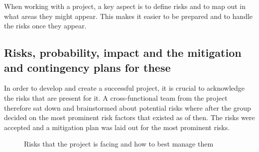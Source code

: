 When working with a project, a key aspect is to define risks and to map out in what areas they might appear. This makes it easier to be prepared and to handle the risks once they appear. 
\subsection{Risks, probability, impact and the mitigation and contingency plans for these}
In order to develop and create a successful project, it is crucial to acknowledge the risks that are present for it. A cross-functional team from the project therefore sat down and brainstormed about potential risks where after the group decided on the most prominent risk factors that existed as of then. The risks were accepted and a mitigation plan was laid out for the most prominent risks. 

\begin{figure}[hbt!]
\centering
{}
\caption{Risks that the project is facing and how to best manage them}
\label{fig:risk_analysis}
\end{figure}
